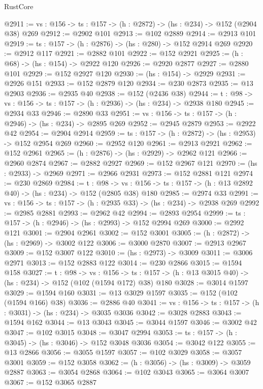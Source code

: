\begin{lexlean}{RustCore}
\begin{coremodule}
@2911 := {vs : @156} -> {ts : @157} -> (h : @2872) -> (hs : @234) -> @152 (@2904 @38) @269
@2912 := @2902 @101
@2913 := @102 @2889
@2914 := @2913 @101
@2919 := {ts : @157} -> (h : @2876) -> (hs : @280) -> @152 @2914 @269
@2920 := @2912 @117
@2921 := @2882 @101
@2922 := @152 @2921
@2925 := (h : @68) -> (hs : @154) -> @2922 @120
@2926 := @2920 @2877
@2927 := @2880 @101
@2929 := @152 @2927 @120
@2930 := (hs : @154) -> @2929
@2931 := @2926 @151
@2933 := @152 @2879 @120
@2934 := @230 @2873
@2935 := @13 @2903
@2936 := @2935 @40
@2938 := @152 (@2436 @38)
@2944 := {t : @98} -> {vs : @156} -> {ts : @157} -> (h : @2936) -> (hs : @234) -> @2938 @180
@2945 := @2934 @33
@2946 := @2890 @33
@2951 := {vs : @156} -> {ts : @157} -> (h : @2946) -> (hs : @234) -> @2895 @269
@2952 := @2945 @2879
@2953 := @2922 @42
@2954 := @2904 @2914
@2959 := {ts : @157} -> (h : @2872) -> (hs : @2953) -> @152 @2954 @269
@2960 := @2952 @120
@2961 := @2913 @2921
@2962 := @152 @2961
@2965 := (h : @2876) -> (hs : @2929) -> @2962 @121
@2966 := @2960 @2874
@2967 := @2882 @2927
@2969 := @152 @2967 @121
@2970 := (hs : @2933) -> @2969
@2971 := @2966 @2931
@2973 := @152 @2881 @121
@2974 := @230 @2869
@2984 := {t : @98} ->
  {vs : @156} -> {ts : @157} -> (h : @13 @2892 @40) -> (hs : @234) -> @152 (@2805 @38) @180
@2985 := @2974 @33
@2991 := {vs : @156} -> {ts : @157} -> (h : @2935 @33) -> (hs : @234) -> @2938 @269
@2992 := @2985 @2881
@2993 := @2962 @42
@2994 := @2893 @2954
@2999 := {ts : @157} -> (h : @2946) -> (hs : @2993) -> @152 @2994 @269
@3000 := @2992 @121
@3001 := @2904 @2961
@3002 := @152 @3001
@3005 := (h : @2872) -> (hs : @2969) -> @3002 @122
@3006 := @3000 @2870
@3007 := @2913 @2967
@3009 := @152 @3007 @122
@3010 := (hs : @2973) -> @3009
@3011 := @3006 @2971
@3013 := @152 @2883 @122
@3014 := @230 @2866
@3015 := @1594 @158
@3027 := {t : @98} ->
  {vs : @156} ->
  {ts : @157} -> (h : @13 @3015 @40) -> (hs : @234) -> @152 (@102 (@1594 @172) @38) @180
@3028 := @3014 @1597
@3029 := @1594 @160
@3031 := @13 @3029 @1597
@3035 := @152 (@102 (@1594 @166) @38)
@3036 := @2886 @40
@3041 := {vs : @156} -> {ts : @157} -> (h : @3031) -> (hs : @234) -> @3035 @3036
@3042 := @3028 @2883
@3043 := @1594 @162
@3044 := @13 @3043
@3045 := @3044 @1597
@3046 := @3002 @42
@3047 := @102 @3015
@3048 := @3047 @2994
@3053 := {ts : @157} -> (h : @3045) -> (hs : @3046) -> @152 @3048 @3036
@3054 := @3042 @122
@3055 := @13 @2866
@3056 := @3055 @1597
@3057 := @102 @3029
@3058 := @3057 @3001
@3059 := @152 @3058
@3062 := (h : @3056) -> (hs : @3009) -> @3059 @2887
@3063 := @3054 @2868
@3064 := @102 @3043
@3065 := @3064 @3007
@3067 := @152 @3065 @2887

\end{coremodule}
\end{lexlean}
